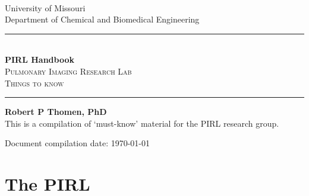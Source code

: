 \documentclass[11pt]{book}
\begin{document}
 
 

\begin{titlepage}
\begin{center}



\; \\ \; \\ \; \\ \; \\ \; \\ \; \\

\Large University of Missouri \\
\Large Department of Chemical and Biomedical Engineering\\

\vspace{2.5cm}




\rule{6cm}{1pt}\\
\vspace{.3cm}
\Large \textbf{PIRL Handbook}\\
\vspace{.5cm}
\textsc{\Large Pulmonary Imaging Research Lab \\ Things to know}\\

\vspace{.1cm}
\rule{6cm}{1pt}

\vspace{4cm}
\Large \textbf{Robert P Thomen, PhD}\\



\vspace{4cm}
\Large This is a compilation of `must-know' material for the PIRL research group.

Document compilation date: \today
\tableofcontents

\end{center}
\end{titlepage}


\chapter{The PIRL}
\end{document}
